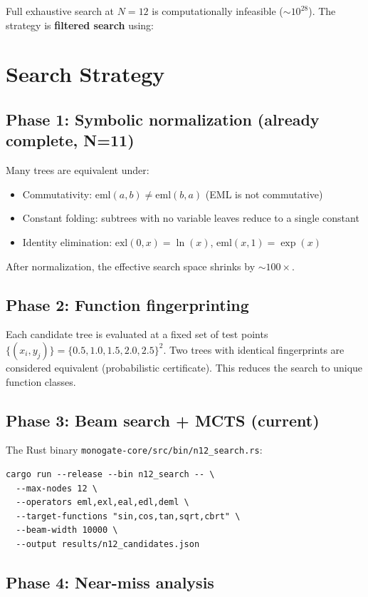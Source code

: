 \documentclass[11pt]{article}
\begin{document}
Full exhaustive search at $N=12$ is computationally infeasible ($\sim 10^{28}$).
The strategy is \textbf{filtered search} using:

\section{Search Strategy}

\subsection{Phase 1: Symbolic normalization (already complete, N=11)}

Many trees are equivalent under:
\begin{itemize}
\item Commutativity: $\mathrm{eml}(a,b) \neq \mathrm{eml}(b,a)$ (EML is not commutative)
\item Constant folding: subtrees with no variable leaves reduce to a single constant
\item Identity elimination: $\mathrm{exl}(0,x) = \ln(x)$, $\mathrm{eml}(x,1) = \exp(x)$
\end{itemize}

After normalization, the effective search space shrinks by $\sim 100\times$.

\subsection{Phase 2: Function fingerprinting}

Each candidate tree is evaluated at a fixed set of test points
$\{(x_i, y_j)\} = \{0.5, 1.0, 1.5, 2.0, 2.5\}^2$.
Two trees with identical fingerprints are considered equivalent (probabilistic certificate).
This reduces the search to unique function classes.

\subsection{Phase 3: Beam search + MCTS (current)}

The Rust binary \texttt{monogate-core/src/bin/n12\_search.rs}:
\begin{lstlisting}
cargo run --release --bin n12_search -- \
  --max-nodes 12 \
  --operators eml,exl,eal,edl,deml \
  --target-functions "sin,cos,tan,sqrt,cbrt" \
  --beam-width 10000 \
  --output results/n12_candidates.json
\end{lstlisting}

\subsection{Phase 4: Near-miss analysis}
\end{document}

